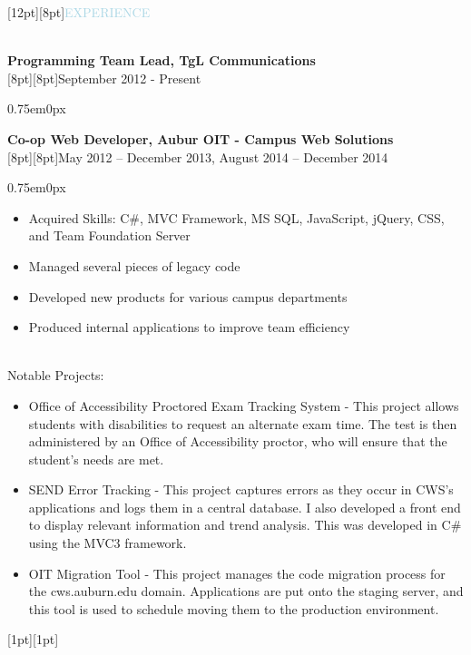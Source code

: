 \documentclass{res}
\newenvironment{ResumeBlock}[1]
{
	\begin{normalsize}
		\raisebox{0pt}[12pt][8pt]{\textcolor{lightblue}{#1}}
	\end{normalsize}
	\\
}
{	
}
\newenvironment{DetailsBlock}[2]
{
	\textbf{\color{darkfont}#1}
	\\
	\raisebox{0pt}[8pt][8pt]{#2}
	\begin{adjustwidth}{0.75em}{0px}
}
{	
	\end{adjustwidth}
}
\begin{document}
\begin{ResumeBlock}{EXPERIENCE}
\begin{DetailsBlock}{Programming Team Lead, TgL Communications}{September 2012 - Present}
\begin{itemize}
			\end{itemize}
		\end{DetailsBlock}		
		\begin{DetailsBlock}{Co-op Web Developer, Aubur OIT - Campus Web Solutions}{May 2012 – December 2013, August 2014 – December 2014 }
			\begin{itemize}
				\item Acquired Skills:  C\#, MVC Framework, MS SQL, JavaScript, jQuery, CSS, and Team Foundation Server 
				\item Managed several pieces of legacy code
				\item Developed new products for various campus departments 
				\item Produced internal applications to improve team efficiency 
			\end{itemize}
			~\\
			Notable Projects:
			\begin{itemize}
				\item Office of Accessibility Proctored Exam Tracking System - This project allows students with disabilities to request an alternate exam time.  The test is then administered by an Office of Accessibility proctor, who will ensure that the student’s needs are met.   
				\item SEND Error Tracking - This project captures errors as they occur in CWS's applications and logs them in a central database.  I also developed a front end to display relevant information and trend analysis.  This was developed in C\# using the MVC3 framework. 
				\item OIT Migration Tool - This project manages the code migration process for the cws.auburn.edu domain.  Applications are put onto the staging server, and this tool is used to schedule moving them to the production environment. 
			\end{itemize}
			\raisebox{0pt}[1pt][1pt]{\space}
		\end{DetailsBlock}
	\end{ResumeBlock}	
	\\\hline
\end{document}
